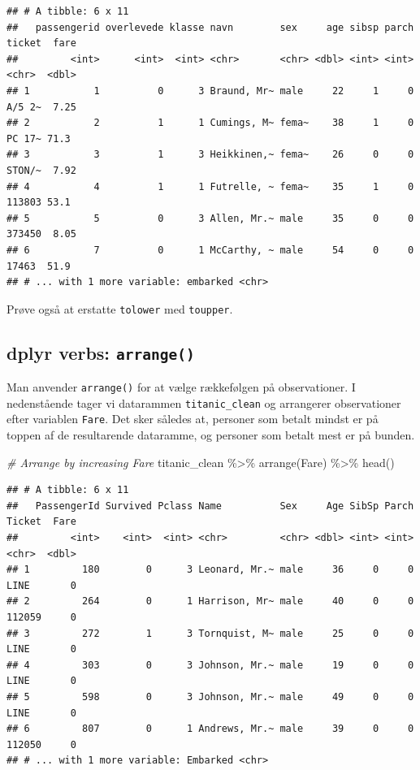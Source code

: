 \documentclass[
]{book}
\newenvironment{Shaded}{\begin{snugshade}}{\end{snugshade}}
\newcommand{\CommentTok}[1]{\textcolor[rgb]{0.56,0.35,0.01}{\textit{#1}}}
\newcommand{\FunctionTok}[1]{\textcolor[rgb]{0.00,0.00,0.00}{#1}}
\newcommand{\NormalTok}[1]{#1}
\newcommand{\SpecialCharTok}[1]{\textcolor[rgb]{0.00,0.00,0.00}{#1}}
\begin{document}
\begin{verbatim}
## # A tibble: 6 x 11
##   passengerid overlevede klasse navn        sex     age sibsp parch ticket  fare
##         <int>      <int>  <int> <chr>       <chr> <dbl> <int> <int> <chr>  <dbl>
## 1           1          0      3 Braund, Mr~ male     22     1     0 A/5 2~  7.25
## 2           2          1      1 Cumings, M~ fema~    38     1     0 PC 17~ 71.3 
## 3           3          1      3 Heikkinen,~ fema~    26     0     0 STON/~  7.92
## 4           4          1      1 Futrelle, ~ fema~    35     1     0 113803 53.1 
## 5           5          0      3 Allen, Mr.~ male     35     0     0 373450  8.05
## 6           7          0      1 McCarthy, ~ male     54     0     0 17463  51.9 
## # ... with 1 more variable: embarked <chr>
\end{verbatim}

Prøve også at erstatte \texttt{tolower} med \texttt{toupper}.

\hypertarget{dplyr-verbs-arrange}{%
\subsection{\texorpdfstring{dplyr verbs: \texttt{arrange()}}{dplyr verbs: arrange()}}\label{dplyr-verbs-arrange}}

Man anvender \texttt{arrange()} for at vælge rækkefølgen på observationer. I nedenstående tager vi datarammen \texttt{titanic\_clean} og arrangerer observationer efter variablen \texttt{Fare}. Det sker således at, personer som betalt mindst er på toppen af de resultarende dataramme, og personer som betalt mest er på bunden.

\begin{Shaded}
\begin{Highlighting}[]
\CommentTok{\# Arrange by increasing Fare}
\NormalTok{titanic\_clean }\SpecialCharTok{\%\textgreater{}\%}
  \FunctionTok{arrange}\NormalTok{(Fare) }\SpecialCharTok{\%\textgreater{}\%}
  \FunctionTok{head}\NormalTok{()}
\end{Highlighting}
\end{Shaded}

\begin{verbatim}
## # A tibble: 6 x 11
##   PassengerId Survived Pclass Name          Sex     Age SibSp Parch Ticket  Fare
##         <int>    <int>  <int> <chr>         <chr> <dbl> <int> <int> <chr>  <dbl>
## 1         180        0      3 Leonard, Mr.~ male     36     0     0 LINE       0
## 2         264        0      1 Harrison, Mr~ male     40     0     0 112059     0
## 3         272        1      3 Tornquist, M~ male     25     0     0 LINE       0
## 4         303        0      3 Johnson, Mr.~ male     19     0     0 LINE       0
## 5         598        0      3 Johnson, Mr.~ male     49     0     0 LINE       0
## 6         807        0      1 Andrews, Mr.~ male     39     0     0 112050     0
## # ... with 1 more variable: Embarked <chr>
\end{verbatim}
\end{document}
